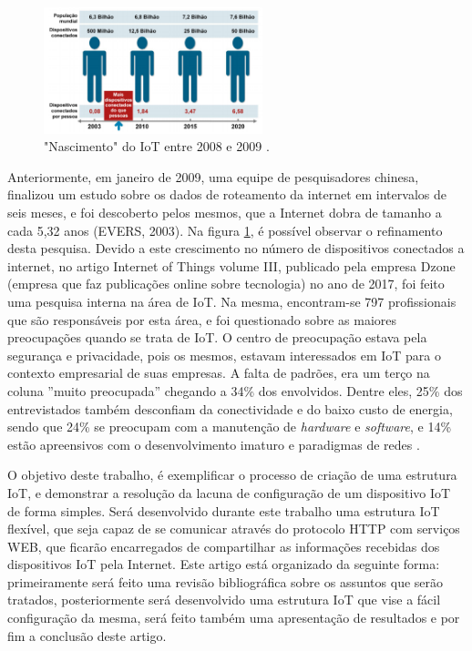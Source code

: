 \documentclass[journal]{IEEEtran}
\begin{document}
\begin{figure}[H]
\centering
\includegraphics[width=2.5in]{um}
\caption{"Nascimento" do IoT entre 2008 e 2009 \cite{Evans}.}
\label{fig_um}
\end{figure}

Anteriormente, em janeiro de 2009, uma equipe de pesquisadores chinesa, finalizou um estudo sobre os dados de roteamento da internet em intervalos de seis meses, e foi descoberto pelos mesmos, que a Internet dobra de tamanho a cada 5,32 anos (EVERS, 2003). Na figura \ref{fig_um}, é possível observar o refinamento desta pesquisa. Devido a este crescimento no número de dispositivos conectados a internet, no artigo Internet of Things volume III, publicado pela empresa Dzone (empresa que faz publicações online sobre tecnologia) no ano de 2017, foi feito uma pesquisa interna na área de IoT. Na mesma, encontram-se 797 profissionais que são responsáveis por esta área, e foi questionado sobre as maiores preocupações quando se trata de IoT. O centro de preocupação estava pela segurança e privacidade, pois os mesmos, estavam interessados em IoT para o contexto empresarial de suas empresas. A falta de padrões, era um terço na coluna ''muito preocupada'' chegando a 34\% dos envolvidos. Dentre eles, 25\% dos entrevistados também  desconfiam da conectividade e do baixo custo de energia, sendo que 24\% se preocupam com a manutenção de \emph{hardware} e \emph{software}, e 14\% estão apreensivos com o desenvolvimento imaturo e paradigmas de redes \cite[p.~4]{Evans}.

O objetivo deste trabalho, é exemplificar o processo de criação de uma estrutura IoT, e demonstrar a resolução da lacuna de configuração de um dispositivo IoT de forma simples. Será desenvolvido durante este trabalho uma estrutura IoT flexível, que seja capaz de se comunicar através do protocolo HTTP com serviços WEB, que ficarão encarregados de compartilhar as informações recebidas dos dispositivos IoT pela Internet. Este artigo está organizado da seguinte forma: primeiramente será feito uma revisão bibliográfica sobre os assuntos que serão tratados, posteriormente será desenvolvido uma estrutura IoT que vise a fácil configuração da mesma, será feito também uma apresentação de resultados e por fim a conclusão deste artigo.
\end{document}
